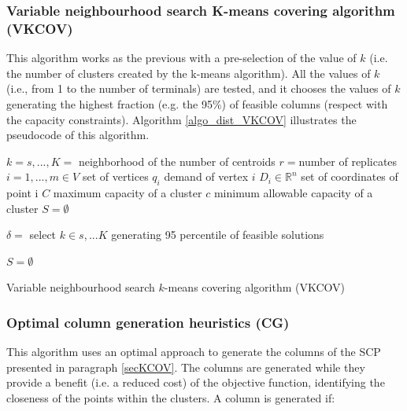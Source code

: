 \subsubsection{Variable neighbourhood search K-means covering algorithm (VKCOV)}

This algorithm works as the previous with a pre-selection of the value of $k$ (i.e. the number of clusters created by the k-means algorithm). All the values of $k$ (i.e., from 1 to the number of terminals) are tested, and it chooses the values of $k$ generating the highest fraction (e.g. the 95\%) of feasible columns (respect with the capacity constraints). Algorithm \ref{algo_dist_VKCOV} illustrates the pseudocode of this algorithm.

\begin{algorithm}[H]
\DontPrintSemicolon
\SetAlgoLined

$k=s,...,K =$ neighborhood of the number of centroids \;
$r=$number of replicates\;
$i=1,...,m \in V$ set of vertices \;
$q_i$ demand of vertex $i$ \;
$D_i \in \mathbb{R}^n $ set of coordinates of point i \;
$C$ maximum capacity of a cluster \;
$c$ minimum allowable capacity of a cluster \;
$S= \emptyset $ \;

$\delta = $ select $k \in s,...K$ generating 95 percentile of feasible solutions\;
 
$S= \emptyset $ \;

\caption{Variable neighbourhood search $k$-means covering algorithm (VKCOV)}
\label{algo_dist_VKCOV}    

\end{algorithm}

\subsubsection{Optimal column generation heuristics (CG)}
This algorithm uses an optimal approach to generate the columns of the SCP presented in paragraph \ref{secKCOV}. The columns are generated while they provide a benefit (i.e. a reduced cost) of the objective function, identifying the closeness of the points within the clusters. A column is generated if:

